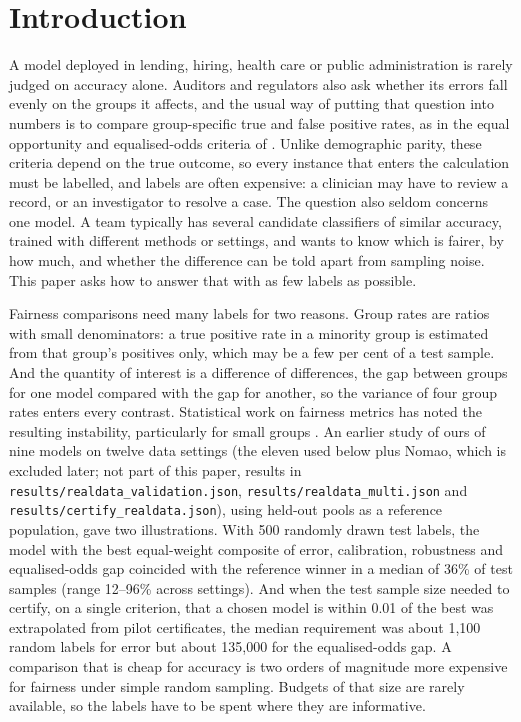 \section{Introduction}\label{sec:intro}

A model deployed in lending, hiring, health care or public administration is rarely judged on accuracy alone. Auditors and regulators also ask whether its errors fall evenly on the groups it affects, and the usual way of putting that question into numbers is to compare group-specific true and false positive rates, as in the equal opportunity and equalised-odds criteria of \citet{hardt2016}. Unlike demographic parity, these criteria depend on the true outcome, so every instance that enters the calculation must be labelled, and labels are often expensive: a clinician may have to review a record, or an investigator to resolve a case. The question also seldom concerns one model. A team typically has several candidate classifiers of similar accuracy, trained with different methods or settings, and wants to know which is fairer, by how much, and whether the difference can be told apart from sampling noise. This paper asks how to answer that with as few labels as possible.

Fairness comparisons need many labels for two reasons. Group rates are ratios with small denominators: a true positive rate in a minority group is estimated from that group's positives only, which may be a few per cent of a test sample. And the quantity of interest is a difference of differences, the gap between groups for one model compared with the gap for another, so the variance of four group rates enters every contrast. Statistical work on fairness metrics has noted the resulting instability, particularly for small groups \citep{lum2022,ferrara2025}. An earlier study of ours of nine models on twelve data settings (the eleven used below plus Nomao, which is excluded later; not part of this paper, results in \texttt{results/realdata\_validation.json}, \texttt{results/realdata\_multi.json} and \texttt{results/certify\_realdata.json}), using held-out pools as a reference population, gave two illustrations. With 500 randomly drawn test labels, the model with the best equal-weight composite of error, calibration, robustness and equalised-odds gap coincided with the reference winner in a median of 36\% of test samples (range 12--96\% across settings). And when the test sample size needed to certify, on a single criterion, that a chosen model is within 0.01 of the best was extrapolated from pilot certificates, the median requirement was about 1,100 random labels for error but about 135,000 for the equalised-odds gap. A comparison that is cheap for accuracy is two orders of magnitude more expensive for fairness under simple random sampling. Budgets of that size are rarely available, so the labels have to be spent where they are informative.

